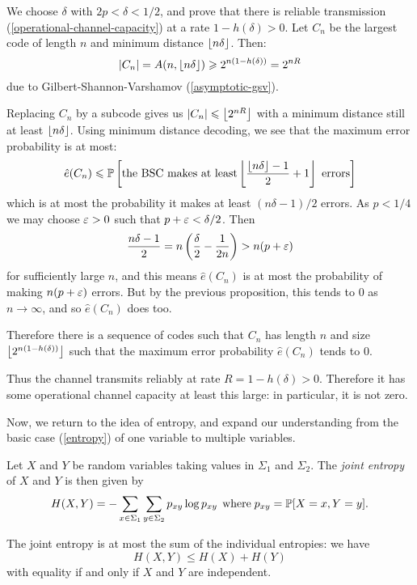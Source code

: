 \documentclass{article}
\begin{document}
\begin{prf}
    We choose $\delta$ with $2p < \delta < 1/2$,
    and prove that there is reliable transmission
    (\ref{operational-channel-capacity})
    at a rate $1 - h(\delta) > 0$.
    Let $C_n$ be the largest code of length $n$
    and minimum distance $\left\lfloor n \delta\right\rfloor$. Then:
    \[
	\left\lvert C_n \right\rvert = A(n, \left\lfloor n\delta\right\rfloor) \geqslant 2^{n(1-h(\delta))} = 2^{nR}
	\]
	due to Gilbert-Shannon-Varshamov (\ref{asymptotic-gsv}).
	
	Replacing $C_n$ by a subcode gives us $\left\lvert C_n \right\rvert \leqslant \left\lfloor2^{nR}\right\rfloor$
	with a minimum distance still at least $\left\lfloor n \delta\right\rfloor$.
	Using minimum distance decoding,
	we see that the maximum error probability is at most:
	\[
	\hat e(C_n) \leqslant
	\mathbb{P} \left[\text{the BSC makes at least}
	\left\lfloor\frac{\left\lfloor n\delta\right\rfloor - 1}{2} + 1\right\rfloor
	\text{ errors}\right]
	\]
	which is at most the probability it makes at least $(n\delta-1)/2$ errors.
	As $p < 1/4$ we may choose $\varepsilon > 0$ such that $p + \varepsilon < \delta/2$. Then
	\[
	\frac{n\delta-1}{2} =
	n \left( \frac{\delta}{2} - \frac{1}{2n} \right) >
	n (p + \varepsilon)
	\]
	for sufficiently large $n$,
	and this means $\hat e(C_n)$
	is at most the probability of making $n(p + \varepsilon)$ errors.
	But by the previous proposition,
	this tends to 0 as $n \to \infty$,
	and so $\hat e(C_n)$ does too.
	
	Therefore there is a sequence of codes such that
	$C_n$ has length $n$ and size $\left\lfloor2^{n(1 - h(\delta))}\right\rfloor$
	such that the maximum error probability $\hat e(C_n)$ tends to 0.
	
	Thus the channel transmits reliably at rate $R = 1 - h(\delta) > 0$.
	Therefore it has some operational channel capacity at least this large:
	in particular, it is not zero.
\end{prf}

Now, we return to the idea of entropy,
and expand our understanding from the basic case (\ref{entropy}) of one variable
to multiple variables.

\begin{definition}
	Let $X$ and $Y$ be random variables taking values in $\Sigma_1$ and $\Sigma_2$. 
	The \textit{joint entropy} of $X$ and $Y$ is then given by
    \[
	H(X, Y) =
	- \sum_{x \in \Sigma_1} \sum_{y \in \Sigma_2} p_{xy} \log p_{xy}
	\mathrel{\, \text{where}} p_{xy} = \mathbb{P}[X = x, Y = y].
	\]
\end{definition}

\begin{proposition}
	\label{joint-entropy-inequality}
    The joint entropy is at most the sum of the individual entropies:
    we have
    \[
	H(X, Y) \leq H(X) + H(Y)
	\]
	with equality if and only if $X$ and $Y$ are independent.
\end{proposition}
\end{document}
